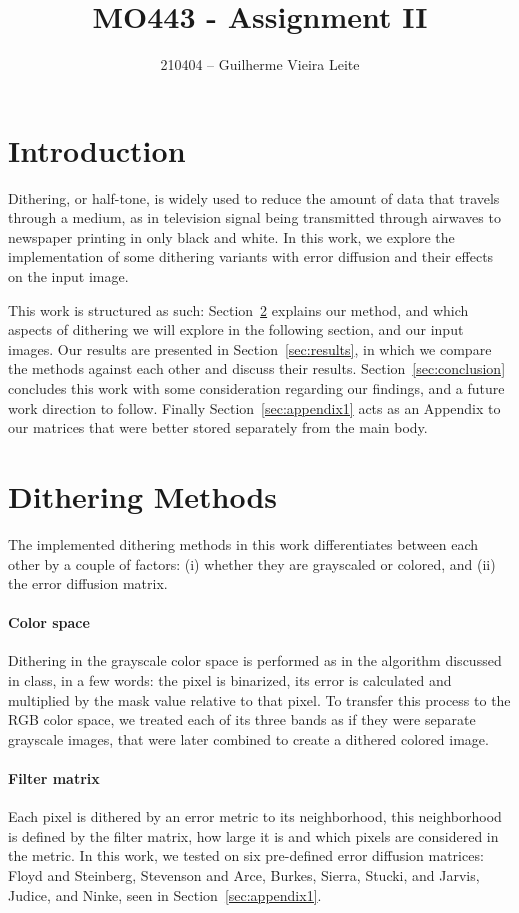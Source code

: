 \documentclass[conference]{IEEEtran}
\begin{document}
\title{MO443 - Assignment II}

\author{210404 -- Guilherme Vieira Leite}

\maketitle

\section{Introduction}
Dithering, or half-tone, is widely used to reduce the amount of data that travels through a medium, as in television signal being transmitted through airwaves to newspaper printing in only black and white. In this work, we explore the implementation of some dithering variants with error diffusion and their effects on the input image.\par
This work is structured as such: Section~\ref{sec:method} explains our method, and which aspects of dithering we will explore in the following section, and our input images. Our results are presented in Section~\ref{sec:results}, in which we compare the methods against each other and discuss their results. Section~\ref{sec:conclusion} concludes this work with some consideration regarding our findings, and a future work direction to follow. Finally Section~\ref{sec:appendix1} acts as an Appendix to our matrices that were better stored separately from the main body.
\section{Dithering Methods}
\label{sec:method}
The implemented dithering methods in this work differentiates between each other by a couple of factors: (i) whether they are grayscaled or colored, and (ii) the error diffusion matrix.
\paragraph{Color space} Dithering in the grayscale color space is performed as in the algorithm discussed in class, in a few words: the pixel is binarized, its error is calculated and multiplied by the mask value relative to that pixel. To transfer this process to the RGB color space, we treated each of its three bands as if they were separate grayscale images, that were later combined to create a dithered colored image.
\paragraph{Filter matrix} Each pixel is dithered by an error metric to its neighborhood, this neighborhood is defined by the filter matrix, how large it is and which pixels are considered in the metric. In this work, we tested on six pre-defined error diffusion matrices: Floyd and Steinberg, Stevenson and Arce, Burkes, Sierra, Stucki, and Jarvis, Judice, and Ninke, seen in Section~\ref{sec:appendix1}.
\end{document}
